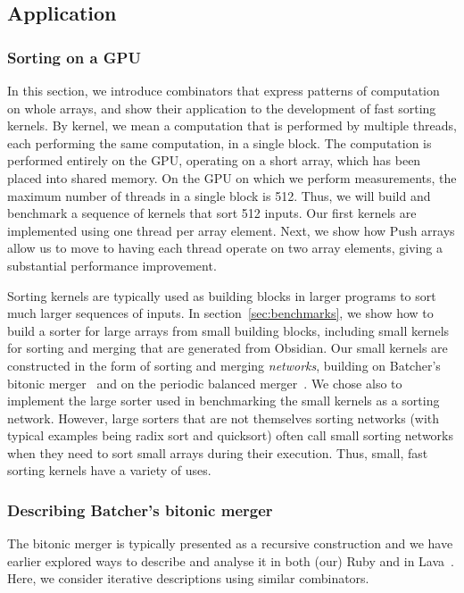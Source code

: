 \subsection{Application}
\label{sec:MARY}

\subsubsection{Sorting on a GPU}
In this section, we introduce combinators that express patterns
of computation on whole arrays, and show their application to the
development of fast sorting kernels.
By kernel, we mean a computation that is performed by multiple
threads, each performing the same computation, in a single block.
The computation is performed entirely on the GPU, operating on
a short array, which has been placed into shared memory.
On the GPU on which we perform measurements, the maximum number
of threads in a single block is 512. Thus, we will build and benchmark
a sequence of
kernels that sort 512 inputs.
Our first kernels are implemented using one thread per array element.
Next, we show how Push arrays allow us to move to having each
thread operate on two array elements, giving a substantial performance
improvement.

Sorting kernels are typically used as building blocks in larger
programs to sort much larger sequences of inputs. In section~\ref{sec:benchmarks},
we show how to build a sorter for large arrays from small building blocks, including
small kernels for sorting and merging that are generated from Obsidian.
Our small kernels are constructed in the form of sorting and merging {\em networks},
building on Batcher's bitonic merger~\cite{Batcher} and
on the periodic balanced merger~\cite{PeriodicBalanced}.
We chose also to implement the large sorter used  in benchmarking the
small kernels as a sorting network. However, large
sorters that are not themselves sorting networks (with typical examples being radix sort and quicksort) often call small sorting networks when they need to sort small arrays during their execution.
Thus, small, fast sorting kernels have a variety of uses.

\subsubsection{Describing Batcher's bitonic merger}

The bitonic merger is typically presented as a recursive
construction and we have earlier explored ways to describe
and analyse it in both (our) Ruby and in Lava~\cite{sortsRuby,LavaSorter}.
Here, we consider iterative descriptions using similar combinators.


